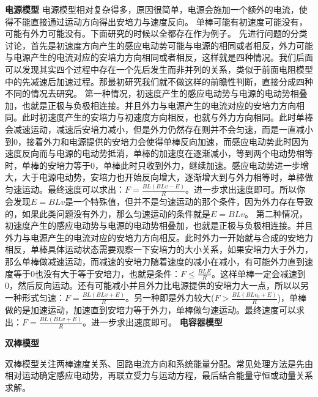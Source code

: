 \textbf{电源模型}
电源模型相对复杂得多，原因很简单，电源会施加一个额外的电流，使得不能直接通过运动方向得出安培力与速度反向。
单棒可能有初速度可能没有，可能有外力可能没有。下面研究的时候以全都存在作为例子。
先进行问题的分类讨论，首先是初速度方向产生的感应电动势可能与电源的相同或者相反，外力可能与电源产生的电流对应的安培力方向相同或者相反，这样就是四种情况。我们后面可以发现其实四个过程中存在一个先后发生而非并列的关系，类似于前面电阻模型中的先减速后加速过程。那最初研究我们就不做这样的前瞻性判断，直接分成四种不同的情况去研究。
第一种情况，初速度产生的感应电动势与电源的电动势相叠加，也就是正极与负极相连接。并且外力与电源产生的电流对应的安培力方向相同。此时初速度产生的安培力与初速度方向相反，也就与外力方向相同。此时单棒会减速运动，减速后安培力减小，但是外力仍然存在则并不会匀速，而是一直减小到0，接着外力和电源提供的安培力会使得单棒反向加速，而感应电动势此时因为速度反向而与电源的电动势抵消，单棒的加速度在逐渐减小，等到两个电动势相等时，单棒的安培力等于0，单棒此时只收到外力，继续加速。感应电动势进一步增大，大于电源电动势，安培力也开始反向增大，逐渐增大到与外力相等时，单棒做匀速运动。最终速度可以求出：$F=\frac{BL(BLv-E)}{R}$。进一步求出速度即可。所以你会发现$E=BLv$是一个特殊值，但并不是匀速运动的那个条件，因为外力存在导致的，如果此类问题没有外力，那么匀速运动的条件就是$E=BLv$。
第二种情况，初速度产生的感应电动势与电源的电动势相叠加，也就是正极与负极相连接。并且外力与电源产生的电流对应的安培力方向相反。此时外力一开始就与合成的安培力相反，单棒具体运动状态需要观察一下安培力的大小关系，如果安培力大于外力，那么单棒做减速运动，而减速的安培力随着速度的减小在减小，有可能外力直到速度等于0也没有大于等于安培力，也就是条件：$F\leq \frac{BLE}{R}$。这样单棒一定会减速到0，然后反向运动。还有可能减小并且外力比电源提供的安培力大一点，所以以另一种形式匀速：$F=\frac{BL(BLv+E)}{R}$。另一种即是外力较大($F>\frac{BL(BLv_0+E)}{R}$)，单棒做的是加速运动，加速直到安培力等于外力，单棒做匀速运动。最终速度可以求出：$F=\frac{BL(BLv+E)}{R}$。进一步求出速度即可。
\textbf{电容器模型}

\textbf{双棒模型}

双棒模型关注两棒速度关系、回路电流方向和系统能量分配。常见处理方法是先由相对运动确定感应电动势，再联立受力与运动方程，最后结合能量守恒或动量关系求解。
